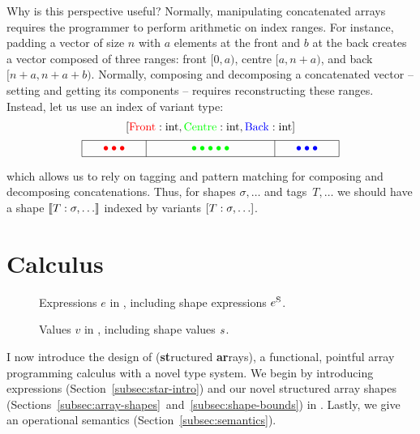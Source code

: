 Why is this perspective useful? Normally, manipulating concatenated arrays requires the programmer to perform arithmetic on index ranges. For instance, padding a vector of size $n$ with $a$ elements at the front and $b$ at the back creates a vector composed of three ranges: front $[0, a)$, centre $[a, n + a)$, and back $[n + a, n + a + b)$. Normally, composing and decomposing a concatenated vector -- \eg{} setting and getting its components -- requires reconstructing these ranges. Instead, let us use an index of variant type:
$$ \begin{array}{c}
\svarianttype{{\color{red} \mathrm{Front}} : \sint, {\color{green} \mathrm{Centre}} : \sint, {\color{blue} \mathrm{Back}} : \sint} \\[0.5em] \begin{tikzpicture}
    \draw (0, 0) -- (8, 0);
    \draw (0, .5) -- (8, .5);
    \draw (0, 0) -- (0, .5);
    \draw (8, 0) -- (8, .5);
    \node[color=red] at (1, .25) {$\bullet\bullet\bullet$};
    \draw (2, 0) -- (2, .5);
    \node[color=green] at (4, .25) {$\bullet\bullet\bullet\bullet\bullet$};
    \draw (6, 0) -- (6, .5);
    \node[color=blue] at (7, .25) {$\bullet\bullet\bullet$};
\end{tikzpicture} 
\end{array} $$
which allows us to rely on tagging and pattern matching for composing and decomposing concatenations.
Thus, for shapes $\sigma, \dots$ and tags~$T, \dots$ we should have a shape $\sconcattype{T : \sigma, \dots}$ indexed by variants $\svarianttype{T : \sigma, \dots}$.

\section{Calculus}
\label{sec:calculus}

\begin{figure}
    \centering
    
    \caption{Expressions $e$ in \starr{}, including shape expressions ${e^\mathrm{S}}$.}
    \label{fig:star-expressions}
\end{figure}

\begin{figure}
    \centering
    
    \caption{Values $v$ in \starr{}, including shape values $s$.}
    \label{fig:star-values}
\end{figure}

I now introduce the design of \textbf{\starr{}} (\textbf{st}ructured \textbf{ar}rays), a functional, pointful array programming calculus with a novel type system. We begin by introducing expressions (Section~\ref{subsec:star-intro}) and our novel structured array shapes (Sections~\ref{subsec:array-shapes}~and~\ref{subsec:shape-bounds}) in \starr{}.
Lastly, we give an operational semantics  (Section~\ref{subsec:semantics}).

